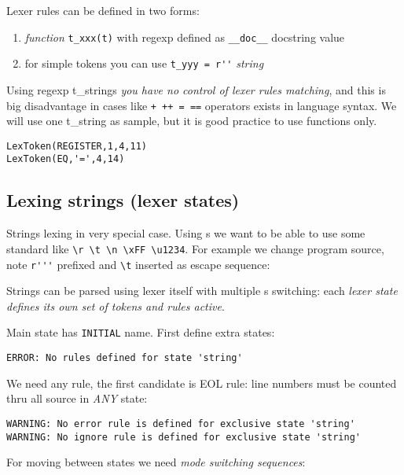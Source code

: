 \clearpage
Lexer rules can be defined in two forms:
\begin{enumerate}[nosep]
  \item \emph{function} \verb|t_xxx(t)| with regexp defined as \verb|__doc__|
  docstring value
  \item for simple tokens you can use \verb|t_yyy = r''| \emph{string}
\end{enumerate}

Using regexp t\_strings \emph{you have no control of lexer rules matching}, and
this is big disadvantage in cases like \verb|+ ++ = ==| operators exists in
language syntax. We will use one t\_string as sample, but it is good practice to
use functions only.

\begin{lstlisting}
LexToken(REGISTER,1,4,11)
LexToken(EQ,'=',4,14)
\end{lstlisting}

\subsection{Lexing strings (lexer states)}

Strings lexing in very special case. Using s we want to be
able to use some standard  like
\verb|\r \t \n \xFF \u1234|. For example we change program source, note
\verb|r'''| prefixed and \verb|\t| inserted
as escape sequence:

Strings can be parsed using lexer itself with multiple s
switching: each \emph{lexer state defines its own set of tokens and rules
active}.

Main state has \verb|INITIAL| name. First define extra states:

\begin{lstlisting}
ERROR: No rules defined for state 'string'
\end{lstlisting}
We need any rule, the first candidate is EOL rule: line numbers
must be counted thru all source in \emph{ANY} state:

\begin{lstlisting}
WARNING: No error rule is defined for exclusive state 'string'
WARNING: No ignore rule is defined for exclusive state 'string'
\end{lstlisting}


For moving between states we need \emph{mode switching sequences}:


